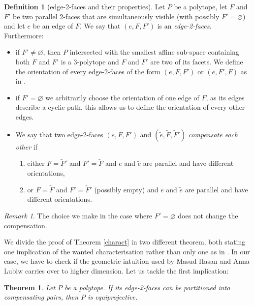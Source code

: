 \documentclass[12pt, notitlepage]{article}
\theoremstyle{plain}
\newtheorem{thm}{Theorem}[section]
\theoremstyle{definition}
\newtheorem{defin}{Definition}
\theoremstyle{plain}
\theoremstyle{remark}
\newtheorem*{rmk}{Remark}
\theoremstyle{plain}
\theoremstyle{plain}
\begin{document}
\begin{defin}[edge-2-faces and their properties]
    Let $P$ be a polytope, let $F$ and $F'$ be two parallel 2-faces that are simultaneously visible (with possibly $F' = \varnothing$) and let $e$ be an edge of $F$. We say that $(e,F,F')$ is an \emph{edge-2-faces}. Furthermore: \begin{itemize}
        \item if $F'\neq \varnothing$, then $P$ intersected with the smallest affine sub-space containing both $F$ and $F'$ is a 3-polytope and $F$ and $F'$ are two of its facets. We define the orientation of every edge-2-faces of the form $(e,F,F')$ or $(e,F',F)$ as in \cite{MHAL}.
        \item if $F' = \varnothing$ we arbitrarily choose the orientation of one edge of $F$, as its edges describe a cyclic path, this allows us to define the orientation of every other edges.
        \item We say that two edge-2-faces $(e,F,F')$ and $(\tilde e,\tilde F,\tilde F')$ \emph{compensate each other} if
        \begin{enumerate}
            \item either $F = \tilde F'$ and $F' = \tilde F$ and $e$ and $\tilde e$ are parallel and have different orientations,
            \item or $F=\tilde F$ and $F' = \tilde F'$ (possibly empty) and $e$ and $\tilde e$ are parallel and have different orientations.
        \end{enumerate}
    \end{itemize}
\end{defin}

\begin{rmk}
    The choice we make in the case where $F'=\varnothing$ does not change the compensation.
\end{rmk}

We divide the proof of Theorem \ref{charact} in two different theorem, both stating one implication of the wanted characterisation rather than only one as in \cite{MHAL}. In our case, we have to check if the geometric intuition used by Masud Hasan and Anna Lubiw carries over to higher dimension. Let us tackle the first implication:

\begin{thm}
\label{frt_implication}
    Let $P$ be a polytope. If its edge-2-faces can be partitioned into compensating pairs, then $P$ is equiprojective.
\end{thm}
\end{document}
